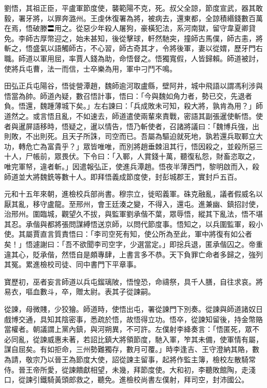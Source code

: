 \begin{pinyinscope}
 劉悟，其祖正臣，平盧軍節度使，襲範陽不克，死。叔父全諒，節度宣武，器其敢毅，署牙將，以罪奔潞州。王虔休復署為將，被病去，還東都，全諒積緡錢數百萬在焉，悟破滕〓用之。從惡少年殺人屠狗，豪橫犯法，系河南獄，留守韋夏卿貸免。李師古厚幣迎之，始未甚知，後從擊球，軒然馳突，撞師古馬僕，師古恚，將斬之，悟盛氣以語觸師古，不心習，師古奇其才，令將後軍，妻以從媦，歷牙門右職。師道以軍用屈，率賈人錢為助，命悟督之。悟獨寬假，人皆歸賴。師道被討，使將兵屯曹，法一而信，士卒樂為用，軍中刁鬥不鳴。



 田弘正兵屯陽谷，悟徙營潭趙，魏師逾河取盧縣，壁阿井，城中飛語以謂馮利涉與悟當為帥。師道內疑，數召悟計事，悟曰：「今與魏如角力者，勢已交，先退者負。悟還，魏踵薄城下矣。」左右諫曰：「兵成敗未可知，殺大將，孰肯為用？」師道然之。或言悟且亂，不如速去，師道遣使兩輩來責戰，密語其副張暹使斬悟。使者與暹屏語移時，悟疑之，暹以情告，悟乃斬使者，召諸將議曰：「魏博兵強，出則敗，不出則死。且天子所誅，司空而已。吾屬為驅迫就死地，孰若還兵取鄆立大功，轉危亡為富貴乎？」眾皆唯唯，而別將趙垂棘沮其行，悟因殺之，並殺所惡三十人，尸帳前，眾畏伏。下令曰：「入鄆，人賞錢十萬，聽復私怨，財畜恣取之，唯完軍帑，違者斬。」因遣報弘正，使進兵潭趙。悟夜半薄西門，黎明啟而入，殺師道並大將魏銑等數十人。即拜悟義成節度使，封彭城郡王，實封戶五百。



 元和十五年來朝，進檢校兵部尚書。穆宗立，徙昭義軍。硃克融亂，議者假威名以厭其亂，移守盧龍。至邢州，會王廷湊之變，不得入，還屯。進兼幽、鎮招討使，治邢州。圍臨城，觀望久不拔，與監軍劉承偕不葉，眾辱悟，縱其下亂法，悟不堪其忍。承偕與都將張問謀縛悟送京師，以問代節度事。悟知之，以兵圍監軍，殺小使。其屬賈直言質責悟曰：「李司空死有知，使公所為至此，軍中將復有如公者矣！」悟遽謝曰：「吾不欲聞李司空字，少選當定。」即捴兵退，匿承偕囚之。帝重違其心，貶承偕，然悟自是頗專肆，上書言多不恭。天下負罪亡命者多歸之，強列其冤。累進檢校司徒、同中書門下平章事。



 寶歷初，巫者妄言師道以兵屯鎦璃陂，悟惶恐，命禱祭，具千人膳，自往求哀。將易衣，嘔血數斗，卒，贈太尉。表其子從諫嗣。



 從諫，母微賤，少狡獪。師道時，使悟出屯，署從諫門下別奏。從諫與師道諸奴日戲博交通，具知其陰密事，悉疏於悟，故悟得立功。悟卒，從諫知留後，持金幣賂當權者。朝議謂上黨內鎮，與河朔異，不可許。左僕射李絳奏言：「悟匿死，眾不必同亂，從諫威惠未著，若詔比鎮大將領節度，馳入軍，笮其未備，使軍情有屬，謀自屈矣。有如拒命，三州勢難獨存，數月可覆。」時李逢吉、王守澄納其賂，數為請，敬宗乃以晉王為節度大使，詔從諫主留事，起將作監主簿，檢校左散騎常侍。晉王帝所愛，從諫饋獻相望，未幾，拜節度使。大和初，李聽敗館陶，走淺口，從諫引鐵騎黃頭郎救之，聽免。進檢校尚書左僕射，拜司空，封沛國公。




\end{pinyinscope}
